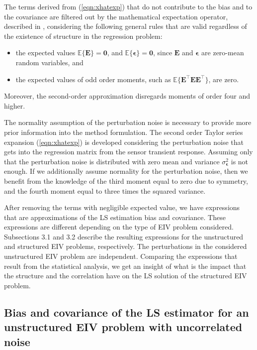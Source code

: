 The terms derived from (\ref{eqn:xhatexp}) that do not contribute to the bias and to the covariance are filtered out by the mathematical expectation operator, described in \citet{Papoulis02Book}, considering the following general rules that are valid regardless of the existence of structure in the regression problem: 
\begin{itemize}
	\item the expected values $\mathbb{E} \{ \mathbf{E} \} = \mathbf{0}$, and $\mathbb{E} \{ \bm{\epsilon} \} = \mathbf{0}$, since $\mathbf{E}$ and $\bm{\epsilon}$ are zero-mean random variables, and
	\item the expected values of odd order moments, such as $\mathbb{E} \{ \mathbf{E}^\top \mathbf{E} \mathbf{E}^\top \}$, are zero.
\end{itemize}
Moreover, the second-order approximation disregards moments of order four and higher.

\color{blue}The normality assumption of the perturbation noise is necessary to provide more prior information into the method formulation.
The second order Taylor series expansion (\ref{eqn:xhatexp}) is developed considering the perturbation noise that gets into the regression matrix from the sensor transient response.
Assuming only that the perturbation noise is distributed with zero mean and variance $\sigma_{\bm{\epsilon}}^2$ is not enough.
If we additionally assume normality for the perturbation noise, then we benefit from the knowledge of the third moment equal to zero due to symmetry, and the fourth moment equal to three times the squared variance\color{black}. 

After removing the terms with negligible expected value, we have expressions that are approximations of the LS estimation bias and covariance. 
These expressions are different depending on the type of EIV problem considered.
Subsections 3.1 and 3.2 describe the resulting expressions for the unstructured and structured EIV problems, respectively.
The perturbations in the considered unstructured EIV problem are independent.
Comparing the expressions that result from the statistical analysis, we get an insight of what is the impact that the structure and the correlation have on the LS solution of the structured EIV problem.


\subsection{Bias and covariance of the LS estimator for an unstructured EIV problem with uncorrelated noise}

